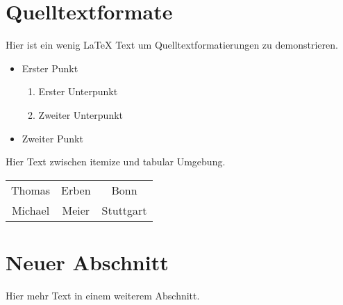\documentclass[11pt,a4paper]{scrartcl}
\begin{document}
 \section{Quelltextformate}
Hier ist    ein wenig \LaTeX{}
Text um
  Quelltextformatierungen
zu  demonstrieren.
\begin{itemize} \item Erster Punkt
\begin{enumerate} \item Erster Unterpunkt
\item Zweiter Unterpunkt
\end{enumerate} \item Zweiter Punkt
\end{itemize}
Hier Text zwischen itemize und tabular Umgebung.

\begin{center}\begin{tabular}{|c|c|c|}
Thomas & Erben & Bonn \\ Michael & Meier &
Stuttgart \\
\end{tabular}\end{center}
\section{Neuer Abschnitt} Hier mehr Text
in einem weiterem Abschnitt.
\end{document}
